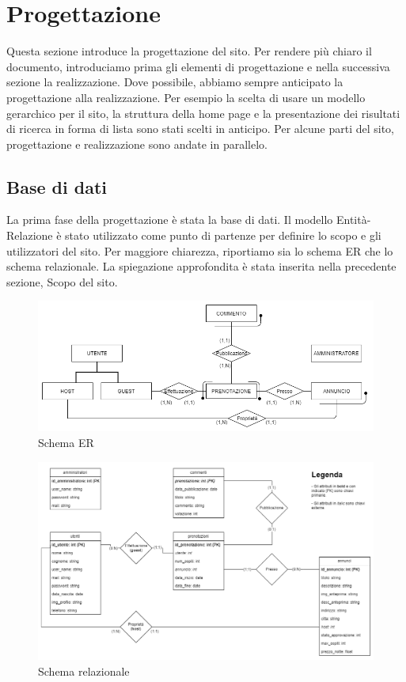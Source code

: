 \documentclass[1_relazione.tex]{subfiles}
\begin{document}
\section{Progettazione}
Questa sezione introduce la progettazione del sito. Per rendere pi\`{u} chiaro il documento, introduciamo prima gli elementi di progettazione e nella successiva sezione la realizzazione. Dove possibile, abbiamo sempre anticipato la progettazione alla realizzazione. Per esempio la scelta di usare un modello gerarchico per il sito, la struttura della home page e la presentazione dei risultati di ricerca in forma di lista sono stati scelti in anticipo. Per alcune parti del sito, progettazione e realizzazione sono andate in parallelo.

\subsection{Base di dati}
La prima fase della progettazione è stata la base di dati.  Il modello Entità-Relazione è stato utilizzato come punto di partenze per definire lo scopo e gli utilizzatori del sito. Per maggiore chiarezza, riportiamo sia lo schema ER che lo schema relazionale. La spiegazione approfondita è stata inserita nella precedente sezione, Scopo del sito.

\begin{figure}[h!]
\centering
\includegraphics[scale=0.5]{immagini/schema_ER-2}
\caption{Schema ER}
\end{figure}

\begin{figure}[h!]
\centering
\includegraphics[scale=0.4]{immagini/schema_relazionale-2}
\caption{Schema relazionale}
\end{figure}
\end{document}
